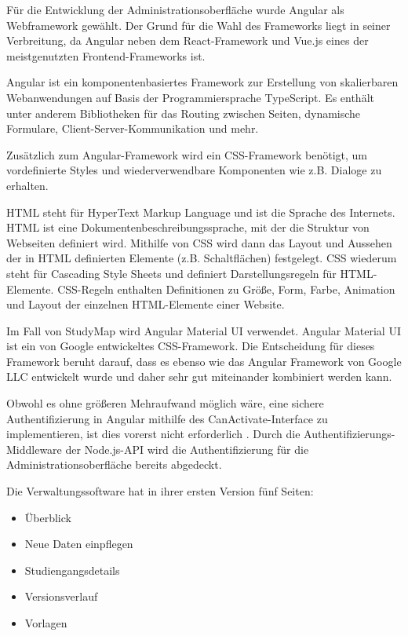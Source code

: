 Für die Entwicklung der Administrationsoberfläche wurde Angular als Webframework gewählt. Der Grund für die Wahl des Frameworks liegt in seiner Verbreitung, da Angular neben dem React-Framework und Vue.js eines der meistgenutzten Frontend-Frameworks ist. \parencite{greif_state_2022}

Angular ist ein komponentenbasiertes Framework zur Erstellung von skalierbaren Webanwendungen auf Basis der Programmiersprache TypeScript. Es enthält unter anderem Bibliotheken für das Routing zwischen Seiten, dynamische Formulare, Client-Server-Kommunikation und mehr. \parencite{google_inc_angular_2023} 

Zusätzlich zum Angular-Framework wird ein CSS-Framework benötigt, um vordefinierte Styles und wiederverwendbare Komponenten wie z.B. Dialoge zu erhalten.

HTML steht für HyperText Markup Language und ist die Sprache des Internets. HTML ist eine Dokumentenbeschreibungssprache, mit der die Struktur von Webseiten definiert wird. Mithilfe von CSS wird dann das Layout und Aussehen der in HTML definierten Elemente (z.B. Schaltflächen) festgelegt. \parencite{mozilla_corporation_html_2023} CSS wiederum steht für Cascading Style Sheets und definiert Darstellungsregeln für HTML-Elemente. CSS-Regeln enthalten Definitionen zu Größe, Form, Farbe, Animation und Layout der einzelnen HTML-Elemente einer Website. \parencite{mozilla_corporation_what_2024}

Im Fall von StudyMap wird Angular Material UI verwendet. Angular Material UI ist ein von Google entwickeltes CSS-Framework. Die Entscheidung für dieses Framework beruht darauf, dass es ebenso wie das Angular Framework von Google LLC entwickelt wurde und daher sehr gut miteinander kombiniert werden kann. \parencite{google_llc_angular_2024}

Obwohl es ohne größeren Mehraufwand möglich wäre, eine sichere Authentifizierung in Angular mithilfe des CanActivate-Interface zu implementieren, ist dies vorerst nicht erforderlich \parencite{google_inc_angular_2024}. Durch die Authentifizierungs-Middleware der Node.js-API wird die Authentifizierung für die Administrationsoberfläche bereits abgedeckt.

\noindent
Die Verwaltungssoftware hat in ihrer ersten Version fünf Seiten:
\begin{itemize}
    \item Überblick
    \item Neue Daten einpflegen
    \item Studiengangsdetails
    \item Versionsverlauf
    \item Vorlagen
\end{itemize}

